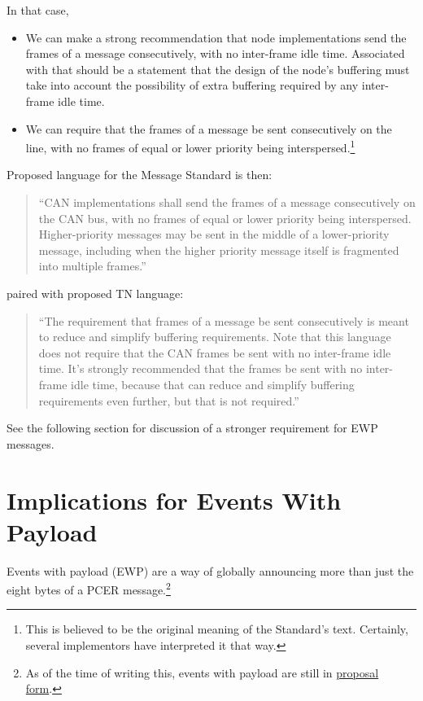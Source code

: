 \documentclass[11pt]{article}
\begin{document}
In that case, 
\begin{itemize}
\item We can make a strong recommendation that node implementations send the frames
    of a message consecutively, with no inter-frame idle time.  Associated with that
    should be a statement that the design of the node's buffering must take 
    into account the possibility of extra buffering required by any 
    inter-frame idle time.
\item We can require that the frames of a message be sent consecutively
    on the line, with no frames of equal or lower priority being 
    interspersed.\footnote{This is believed to be the original meaning of the 
                    Standard's text. Certainly, several implementors have 
                    interpreted it that way.}
\end{itemize}

Proposed language for the Message Standard is then:
\begin{quote}
    ``CAN implementations shall send the frames of a message consecutively on the CAN bus, 
    with no frames of equal or lower priority being interspersed. 
    Higher-priority messages may be sent in the middle of a lower-priority message, 
    including when the higher priority message itself is fragmented into multiple frames.” 
\end{quote}
paired with proposed TN language:
\begin{quote}
    ``The requirement that frames of a message be sent consecutively is meant to reduce
    and simplify buffering requirements. Note that this language does
    not require that the CAN frames be sent with no inter-frame idle time.
    It's strongly recommended that the frames be sent with no inter-frame idle time, because
    that can reduce and simplify buffering requirements even further, but that
    is not required.” 
\end{quote}

See the following section for discussion of a stronger requirement for 
EWP messages.

\section{Implications for Events With Payload}

Events with payload (EWP) are a way of globally announcing more than 
just the eight bytes of a PCER 
message.\footnote{As of the time of writing this, events with payload are still in
    \href{https://github.com/openlcb/documents/pull/94}{proposal form}.
    }
\end{document}
